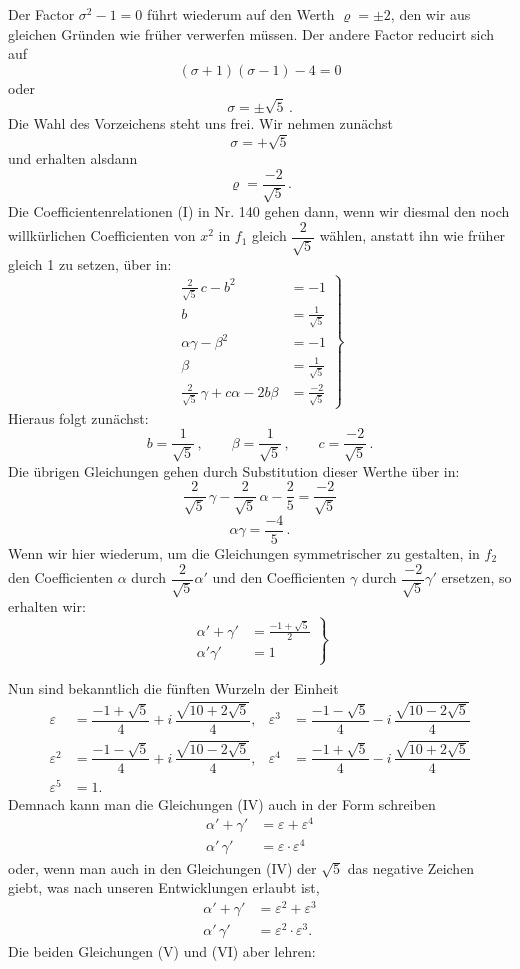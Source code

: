 \documentclass[11pt]{article}
\providecommand{\weberpage}[1]{}
\providecommand{\weq}[2]{\begin{equation}\tag{#1}#2\end{equation}}
\begin{document}
\weberpage{164}
Der Factor $\sigma^2-1=0$ führt wiederum auf den Werth $\varrho=\pm 2$, den wir aus gleichen Gründen wie früher verwerfen müssen. Der andere Factor reducirt sich auf
\[
(\sigma+1)(\sigma-1)-4=0
\]
oder
\[
\sigma=\pm\sqrt5\,.
\]
Die Wahl des Vorzeichens steht uns frei. Wir nehmen zunächst
\[
\sigma=+\sqrt5
\]
und erhalten alsdann
\[
\varrho=\frac{-2}{\sqrt5}\,.
\]
Die Coefficientenrelationen (I) in Nr. 140 gehen dann, wenn wir diesmal den noch willkürlichen Coefficienten von $x^2$ in $f_1$ gleich $\dfrac{2}{\sqrt5}$ wählen, anstatt ihn wie früher gleich 1 zu setzen, über in:
\weq{III}{\left.\begin{aligned}
\frac{2}{\sqrt5}\,c - b^2 &= -1\\
b &= \frac{1}{\sqrt5}\\
\alpha\gamma-\beta^2 &= -1\\
\beta &= \frac{1}{\sqrt5}\\
\frac{2}{\sqrt5}\,\gamma+c\alpha-2b\beta &= \frac{-2}{\sqrt5}
\end{aligned}\right\}}
Hieraus folgt zunächst:
\[
b=\frac{1}{\sqrt5}\,,\qquad \beta=\frac{1}{\sqrt5}\,,\qquad c=\frac{-2}{\sqrt5}\,.
\]
Die übrigen Gleichungen gehen durch Substitution dieser Werthe über in:
\[
\frac{2}{\sqrt5}\,\gamma-\frac{2}{\sqrt5}\,\alpha-\frac{2}{5}=\frac{-2}{\sqrt5}
\]
\[
\alpha\gamma=\frac{-4}{5}\,.
\]
Wenn wir hier wiederum, um die Gleichungen symmetrischer zu gestalten, in $f_2$ den Coefficienten $\alpha$ durch $\dfrac{2}{\sqrt5}\alpha'$ und den Coefficienten $\gamma$ durch $\dfrac{-2}{\sqrt5}\gamma'$ ersetzen, so erhalten wir:
\weq{IV}{\left.\begin{aligned}
\alpha'+\gamma' &= \frac{-1+\sqrt5}{2}\\
\alpha'\gamma' &= 1
\end{aligned}\right\}}


\weberpage{165}
Nun sind bekanntlich die fünften Wurzeln der Einheit
\[
\begin{aligned}
\varepsilon &= \dfrac{-1+\sqrt5}{4} + i\,\dfrac{\sqrt{10+2\sqrt5}}{4}, &
\varepsilon^3 &= \dfrac{-1-\sqrt5}{4} - i\,\dfrac{\sqrt{10-2\sqrt5}}{4} \\
\varepsilon^2 &= \dfrac{-1-\sqrt5}{4} + i\,\dfrac{\sqrt{10-2\sqrt5}}{4}, &
\varepsilon^4 &= \dfrac{-1+\sqrt5}{4} - i\,\dfrac{\sqrt{10+2\sqrt5}}{4} \\
\varepsilon^5 &= 1. &&
\end{aligned}
\]
Demnach kann man die Gleichungen (IV) auch in der Form schreiben
\weq{V}{\begin{aligned} \alpha' + \gamma' &= \varepsilon + \varepsilon^4 \\ \alpha'\,\gamma' &= \varepsilon\cdot\varepsilon^4 \end{aligned}}
oder, wenn man auch in den Gleichungen (IV) der $\sqrt5$ das negative Zeichen giebt, was nach unseren Entwicklungen erlaubt ist,
\weq{VI}{\begin{aligned} \alpha' + \gamma' &= \varepsilon^2 + \varepsilon^3 \\ \alpha'\,\gamma' &= \varepsilon^2\cdot\varepsilon^3. \end{aligned}}
Die beiden Gleichungen (V) und (VI) aber lehren:
\end{document}
